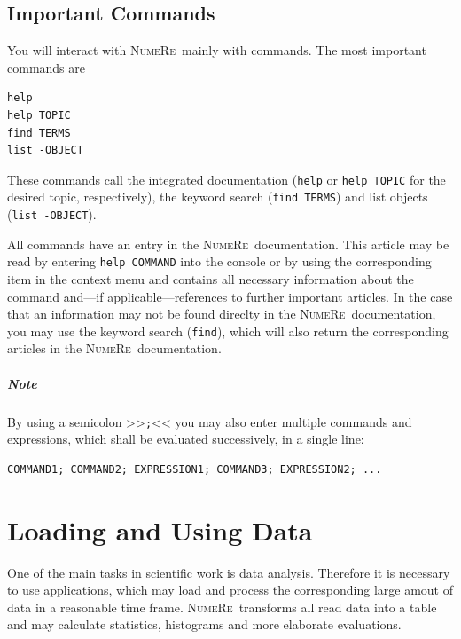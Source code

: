 \documentclass[DIV=14,headsepline,footsepline]{scrbook}
\newcommand{\NR}{\textsc{Nu\-me\-Re}}
\begin{document}
			\section{Important Commands}
				You will interact with \NR\ mainly with commands. The most important commands are
					\begin{lstlisting}
help
help TOPIC
find TERMS
list -OBJECT
					\end{lstlisting}
					These commands call the integrated documentation (\lstinline+help+ or \lstinline+help TOPIC+ for the desired topic, respectively), the keyword search (\lstinline+find TERMS+) and list objects (\lstinline+list -OBJECT+).
					
					All commands have an entry in the \NR\ documentation. This article may be read by entering \lstinline+help COMMAND+ into the console or by using the corresponding item in the context menu and contains all necessary information about the command and---if applicable---references to further important articles. In the case that an information may not be found direclty in the \NR\ documentation, you may use the keyword search (\lstinline+find+), which will also return the corresponding articles in the \NR\ documentation.
					\paragraph{Note}
						By using a semicolon >>\lstinline+;+<< you may also enter multiple commands and expressions, which shall be evaluated successively, in a single line:
						\begin{lstlisting}
COMMAND1; COMMAND2; EXPRESSION1; COMMAND3; EXPRESSION2; ...
						\end{lstlisting}
		\chapter{Loading and Using Data}
			One of the main tasks in scientific work is data analysis. Therefore it is necessary to use applications, which may load and process the corresponding large amout of data in a reasonable time frame. \NR\ transforms all read data into a table and may calculate statistics, histograms and more elaborate evaluations.
\end{document}
